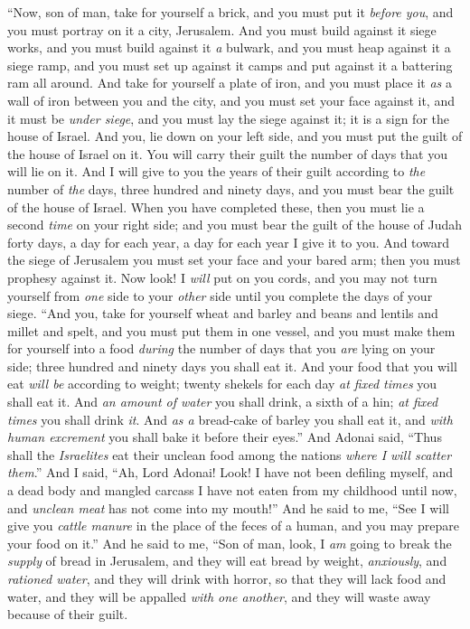 \begin{biblechapter} %
 “Now, son of man, take for yourself a brick, and you must put it \textit{before you}, and you must portray on it a city, Jerusalem.
\verse And you must build against it siege works, and you must build against it \textit{a} bulwark, and you must heap against it a siege ramp, and you must set up against it camps and put against it a battering ram all around.
\verse And take for yourself a plate of iron, and you must place it \textit{as} a wall of iron between you and the city, and you must set your face against it, and it must be \textit{under siege}, and you must lay the siege against it; it is a sign for the house of Israel.
\verse And you, lie down on your left side, and you must put the guilt of the house of Israel on it. You will carry their guilt the number of days that you will lie on it.
\verse And I will give to you the years of their guilt according to \textit{the} number of \textit{the} days, three hundred and ninety days, and you must bear the guilt of the house of Israel.
\verse When you have completed these, then you must lie a second \textit{time} on your right side; and you must bear the guilt of the house of Judah forty days, a day for each year, a day for each year I give it to you.
\verse And toward the siege of Jerusalem you must set your face and your bared arm; then you must prophesy against it.
\verse Now look! I \textit{will} put on you cords, and you may not turn yourself from \textit{one} side to your \textit{other} side until you complete the days of your siege.
 “And you, take for yourself wheat and barley and beans and lentils and millet and spelt, and you must put them in one vessel, and you must make them for yourself into a food \textit{during} the number of days that you \textit{are} lying on your side; three hundred and ninety days you shall eat it.
\verse And your food that you will eat \textit{will be} according to weight; twenty shekels for each day \textit{at fixed times} you shall eat it.
\verse And \textit{an amount of water} you shall drink, a sixth of a hin; \textit{at fixed times} you shall drink \textit{it}.
\verse And \textit{as a} bread-cake of barley you shall eat it, and \textit{with human excrement} you shall bake it before their eyes.”
\verse And Adonai said, “Thus shall the \textit{Israelites} eat their unclean food among the nations \textit{where I will scatter them}.”
\verse And I said, “Ah, Lord Adonai! Look! I have not been defiling myself, and a dead body and mangled carcass I have not eaten from my childhood until now, and \textit{unclean meat} has not come into my mouth!”
\verse And he said to me, “See I will give you \textit{cattle manure} in the place of the feces of a human, and you may prepare your food on it.”
\verse And he said to me, “Son of man, look, I \textit{am} going to break the \textit{supply} of bread in Jerusalem, and they will eat bread by weight, \textit{anxiously}, and \textit{rationed water}, and they will drink with horror,
\verse so that they will lack food and water, and they will be appalled \textit{with one another}, and they will waste away because of their guilt.
\end{biblechapter}

